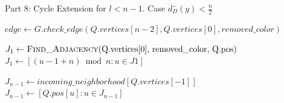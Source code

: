
\begin{algorithm}[H]
    \caption{Part 8: Cycle Extension for \( l < n - 1 \). Case \( d^-_D(y) < \frac{n}{2} \)}
    \begin{algorithmic}[1]
            \State $edge \gets G.check\_edge(Q.vertices[n - 2], Q.vertices[0], removed\_color)$
                \State \Return {}
            \EndIf

            \State $J_1 \gets \Call{Find\_Adjacency}{$Q.vertices[0], removed\_color, Q.pos$}$
            \State $J_1 \gets [(u - 1 + n) \bmod n : u \in J1]$

            \State $J_{n-1} \gets incoming\_neighborhood[Q.vertices[-1]]$
            \State $J_{n-1} \gets [Q.pos[u] : u \in J_{n-1}]$
        \EndFunction
    \end{algorithmic}
\end{algorithm}
